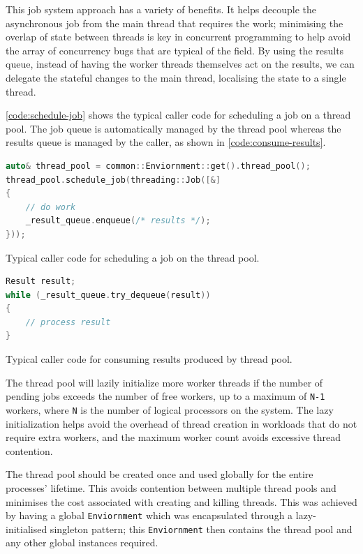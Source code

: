 This job system approach has a variety of benefits. It helps decouple the asynchronous job from the main thread that requires the work; minimising the overlap of state between threads is key in concurrent programming to help avoid the array of concurrency bugs that are typical of the field. By using the results queue, instead of having the worker threads themselves act on the results, we can delegate the stateful changes to the main thread, localising the state to a single thread.

\autoref{code:schedule-job} shows the typical caller code for scheduling a job on a thread pool. The job queue is automatically managed by the thread pool whereas the results queue is managed by the caller, as shown in \autoref{code:consume-results}.

\begin{lstfloat}[H]
    \begin{lstlisting}[language=c++]
auto& thread_pool = common::Enviornment::get().thread_pool();
thread_pool.schedule_job(threading::Job([&]
{
    // do work
    _result_queue.enqueue(/* results */);
}));
    \end{lstlisting}
    \caption{Typical caller code for scheduling a job on the thread pool.}
    \label{code:schedule-job}
\end{lstfloat}

\begin{lstfloat}[H]
    \begin{lstlisting}[language=c++]
Result result;
while (_result_queue.try_dequeue(result))
{
    // process result
}
    \end{lstlisting}
    \caption{Typical caller code for consuming results produced by thread pool.}
    \label{code:consume-results}
\end{lstfloat}

The thread pool will lazily initialize more worker threads if the number of pending jobs exceeds the number of free workers, up to a maximum of \texttt{N-1} workers, where \texttt{N} is the number of logical processors on the system. The lazy initialization helps avoid the overhead of thread creation in workloads that do not require extra workers, and the maximum worker count avoids excessive thread contention.

The thread pool should be created once and used globally for the entire processes' lifetime. This avoids contention between multiple thread pools and minimises the cost associated with creating and killing threads. This was achieved by having a global \texttt{Enviornment} which was encapsulated through a lazy-initialised singleton pattern; this \texttt{Enviornment} then contains the thread pool and any other global instances required.


 \cite{moodycamel, moodycamel-benchmark}

